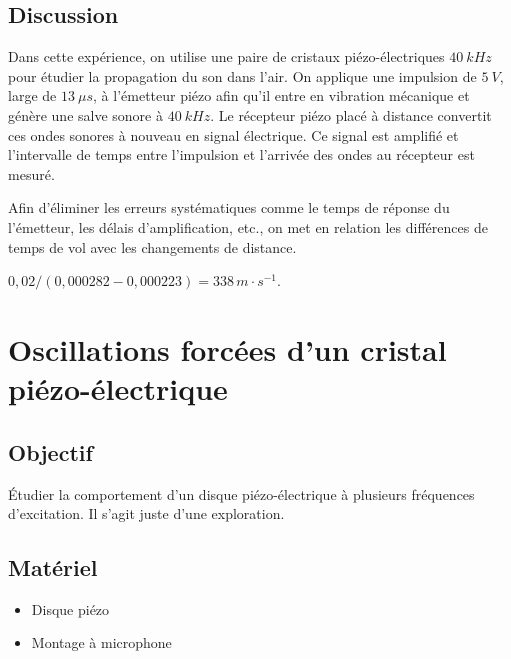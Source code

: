 \documentclass{book}
\begin{document}
\subsection{Discussion}


Dans cette expérience, on utilise une paire de cristaux piézo-électriques $40\ kHz$ pour étudier la propagation du son dans l'air. On applique une impulsion de $5\ V$, large de $13\ \mu s$, à l'émetteur piézo afin qu'il entre en vibration mécanique et génère une salve sonore à $40\ kHz$. Le récepteur piézo placé à distance convertit ces ondes sonores à nouveau en signal électrique. Ce signal est amplifié et l'intervalle de temps entre l'impulsion et l'arrivée des ondes au récepteur est mesuré.



Afin d'éliminer les erreurs systématiques comme le temps de réponse du l'émetteur, les délais d'amplification, etc., on met en relation les différences de temps de vol avec les changements de distance.



$0,02/(0,000282-0,000223)=338\, m\cdot s^{-1}$.







\section{Oscillations forcées d'un cristal piézo-électrique}



\subsection{Objectif}


Étudier la comportement d'un disque piézo-électrique à plusieurs fréquences d'excitation. Il s'agit juste d'une exploration.




\subsection{Matériel}


\begin{itemize}
  \item Disque piézo
  \item Montage à microphone
\end{itemize}
\end{document}
